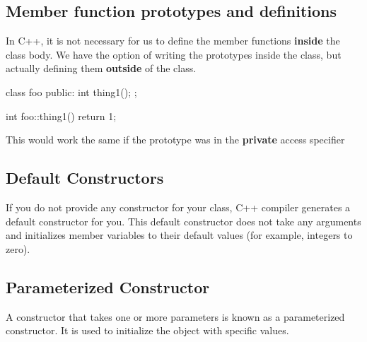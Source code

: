 \documentclass{report}
\begin{document}
    \bigbreak \noindent 
    \subsection{Member function prototypes and definitions}
    \bigbreak \noindent 
    In C++, it is not necessary for us to define the member functions \textbf{inside} the class body. We have the option of writing the prototypes inside the class, but actually defining them \textbf{outside} of the class.
    \bigbreak \noindent 
    
    \begin{cppcode}
class foo {
public:
    int thing1();
};

int foo::thing1() {
    return 1;
}
    \end{cppcode}
    
    \bigbreak \noindent 
    \begin{notebox}
        This would work the same if the prototype was in the \textbf{private} access specifier
    \end{notebox}
    

    \pagebreak \bigbreak \noindent 
    \subsection{Default Constructors}
    \bigbreak \noindent 
    \begin{concept}
        If you do not provide any constructor for your class, C++ compiler generates a default constructor for you. This default constructor does not take any arguments and initializes member variables to their default values (for example, integers to zero).
    \end{concept}

    \bigbreak \noindent 
    \subsection{Parameterized Constructor}
    \bigbreak \noindent 
    \begin{concept}
        A constructor that takes one or more parameters is known as a parameterized constructor. It is used to initialize the object with specific values.
    \end{concept}
    
    \bigbreak \noindent 
\end{document}
